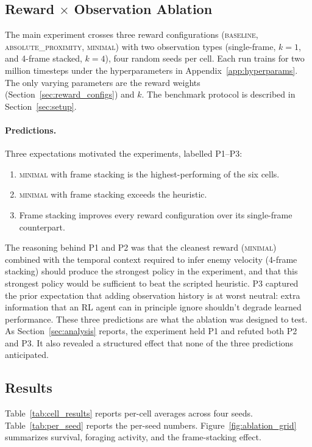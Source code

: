 \documentclass[12pt,a4paper,titlepage]{article}
\begin{document}
\subsection{Reward $\times$ Observation Ablation}
\label{sec:ablation}

The main experiment crosses three reward configurations (\textsc{baseline}, \textsc{absolute\_proximity}, \textsc{minimal}) with two observation types (single-frame, $k = 1$, and 4-frame stacked, $k = 4$), four random seeds per cell. Each run trains for two million timesteps under the hyperparameters in Appendix~\ref{app:hyperparams}. The only varying parameters are the reward weights (Section~\ref{sec:reward_configs}) and $k$. The benchmark protocol is described in Section~\ref{sec:setup}.

\paragraph{Predictions.} Three expectations motivated the experiments, labelled P1--P3:
\begin{enumerate}[label=(P\arabic*),nosep,leftmargin=2.8em]
  \item \textsc{minimal} with frame stacking is the highest-performing of the six cells.
  \item \textsc{minimal} with frame stacking exceeds the heuristic.
  \item Frame stacking improves every reward configuration over its single-frame counterpart.
\end{enumerate}
The reasoning behind P1 and P2 was that the cleanest reward (\textsc{minimal}) combined with the temporal context required to infer enemy velocity (4-frame stacking) should produce the strongest policy in the experiment, and that this strongest policy would be sufficient to beat the scripted heuristic. P3 captured the prior expectation that adding observation history is at worst neutral: extra information that an RL agent can in principle ignore shouldn't degrade learned performance. These three predictions are what the ablation was designed to test. As Section~\ref{sec:analysis} reports, the experiment held P1 and refuted both P2 and P3. It also revealed a structured effect that none of the three predictions anticipated.

\subsection{Results}
\label{sec:results}

Table~\ref{tab:cell_results} reports per-cell averages across four seeds. Table~\ref{tab:per_seed} reports the per-seed numbers. Figure~\ref{fig:ablation_grid} summarizes survival, foraging activity, and the frame-stacking effect.
\end{document}
